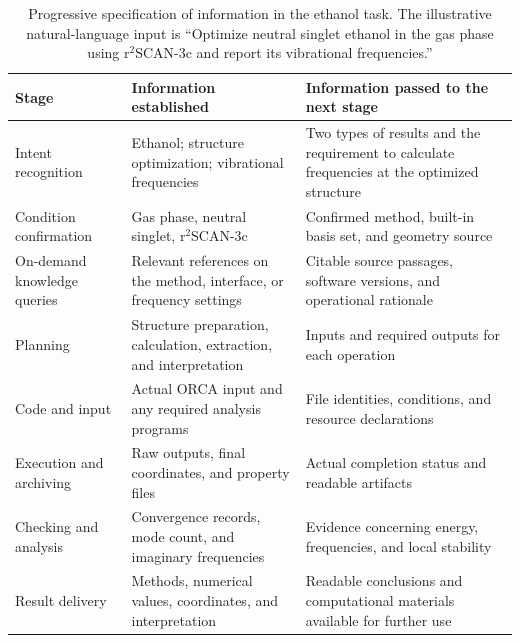 \begin{table}[htbp]
  \centering\small
  \caption{Progressive specification of information in the ethanol task.
  The illustrative natural-language input is ``Optimize neutral singlet ethanol in the gas phase using r$^{2}$SCAN-3c and report its vibrational frequencies.''}
  \label{tab:workflow-example}
  \begin{tabularx}{\linewidth}{>{\raggedright\arraybackslash}p{2.35cm}YY}
    \toprule
    Stage & Information established & Information passed to the next stage\\
    \midrule
    Intent recognition & Ethanol; structure optimization; vibrational frequencies & Two types of results and the requirement to calculate frequencies at the optimized structure\\
    Condition confirmation & Gas phase, neutral singlet, r$^{2}$SCAN-3c & Confirmed method, built-in basis set, and geometry source\\
    On-demand knowledge queries & Relevant references on the method, interface, or frequency settings & Citable source passages, software versions, and operational rationale\\
    Planning & Structure preparation, calculation, extraction, and interpretation & Inputs and required outputs for each operation\\
    Code and input & Actual ORCA input and any required analysis programs & File identities, conditions, and resource declarations\\
    Execution and archiving & Raw outputs, final coordinates, and property files & Actual completion status and readable artifacts\\
    Checking and analysis & Convergence records, mode count, and imaginary frequencies & Evidence concerning energy, frequencies, and local stability\\
    Result delivery & Methods, numerical values, coordinates, and interpretation & Readable conclusions and computational materials available for further use\\
    \bottomrule
  \end{tabularx}
\end{table}
